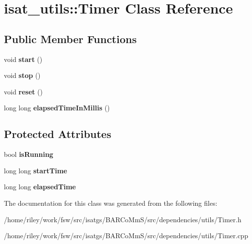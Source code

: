 \hypertarget{classisat__utils_1_1_timer}{}\section{isat\+\_\+utils\+:\+:Timer Class Reference}
\label{classisat__utils_1_1_timer}
\subsection*{Public Member Functions}
\begin{DoxyCompactItemize}
\item 
void {\bfseries start} ()\hypertarget{classisat__utils_1_1_timer_a50533c1a5886c8d7f8d6a8f4c4263e10}{}\label{classisat__utils_1_1_timer_a50533c1a5886c8d7f8d6a8f4c4263e10}

\item 
void {\bfseries stop} ()\hypertarget{classisat__utils_1_1_timer_a7133c14924da9e62b8f82a371777318a}{}\label{classisat__utils_1_1_timer_a7133c14924da9e62b8f82a371777318a}

\item 
void {\bfseries reset} ()\hypertarget{classisat__utils_1_1_timer_aa7ac2c962ccd98a7c96186e1fccddfb9}{}\label{classisat__utils_1_1_timer_aa7ac2c962ccd98a7c96186e1fccddfb9}

\item 
long long {\bfseries elapsed\+Time\+In\+Millis} ()\hypertarget{classisat__utils_1_1_timer_afa2f120c22035e1f4b3f6c92f7e7cf1c}{}\label{classisat__utils_1_1_timer_afa2f120c22035e1f4b3f6c92f7e7cf1c}

\end{DoxyCompactItemize}
\subsection*{Protected Attributes}
\begin{DoxyCompactItemize}
\item 
bool {\bfseries is\+Running}\hypertarget{classisat__utils_1_1_timer_a8a637d42aecb7d537f2f821b457a7215}{}\label{classisat__utils_1_1_timer_a8a637d42aecb7d537f2f821b457a7215}

\item 
long long {\bfseries start\+Time}\hypertarget{classisat__utils_1_1_timer_a68dfdc09b8adde7c866e4e0a5a1d2dc8}{}\label{classisat__utils_1_1_timer_a68dfdc09b8adde7c866e4e0a5a1d2dc8}

\item 
long long {\bfseries elapsed\+Time}\hypertarget{classisat__utils_1_1_timer_a397f3b2dc682ea23b0611bb86bd9695e}{}\label{classisat__utils_1_1_timer_a397f3b2dc682ea23b0611bb86bd9695e}

\end{DoxyCompactItemize}


The documentation for this class was generated from the following files\+:\begin{DoxyCompactItemize}
\item 
/home/riley/work/fsw/src/isatgs/\+B\+A\+R\+Co\+Mm\+S/src/dependencies/utils/Timer.\+h\item 
/home/riley/work/fsw/src/isatgs/\+B\+A\+R\+Co\+Mm\+S/src/dependencies/utils/Timer.\+cpp\end{DoxyCompactItemize}
